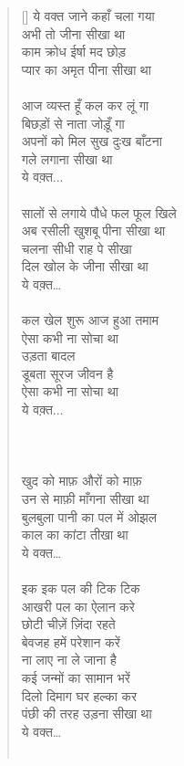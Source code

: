\begin{verse}[\versewidth]\texthindi{
ये वक्त जाने कहाँ चला गया\\
अभी तो जीना सीखा था\\
काम क्रोध ईर्षा मद छोड़\\
प्यार का अमृत पीना सीखा था\\
\\
आज व्यस्त हूँ कल कर लूं गा\\
बिछड़ों से नाता जोड़ूँ गा\\
अपनों को मिल सुख दुःख बाँटना\\
गले लगाना सीखा था\\
ये वक़्त...\\
\\
सालों से लगाये पौधे फल फूल खिले\\
अब रसीली खुशबू पीना सीखा था\\
चलना सीधी राह पे सीखा\\
दिल खोल के जीना सीखा था\\
ये वक़्त…\\
\\
कल खेल शुरू आज हुआ तमाम\\
ऐसा कभी ना सोचा था\\
उड़ता बादल\\
डूबता सूरज जीवन है \\
ऐसा कभी ना सोचा था\\
ये वक़्त...\\
\\
\\
\\
खुद को माफ़ औरों को माफ़\\
उन से माफ़ी माँगना सीखा था\\
बुलबुला पानी का पल में ओझल\\
काल का कांटा तीखा था\\
ये वक्त…\\
\\
इक इक पल की टिक टिक\\
आखरी पल का ऐलान करे\\
छोटी चीज़ें ज़िंदा रहते\\
बेवजह हमें परेशान करें\\
ना लाए ना ले जाना है\\
कई जन्मों का सामान भरें\\
दिलो दिमाग घर हल्का कर\\
पंछी की तरह उड़ना सीखा था\\
ये वक्त…\\
\\
}
\end{verse}
